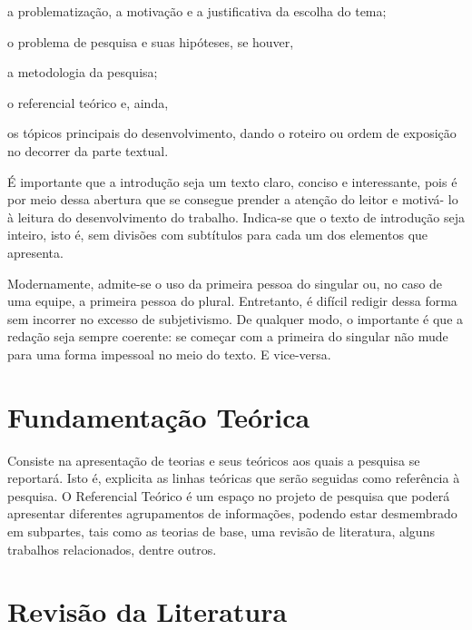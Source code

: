\documentclass[12pt,oneside,a4paper,chapter=TITLE,section=TITLE,sumario=tradicional]{abntex2}
\begin{document}
\begin{lista}
    \item a problematização, a motivação e a justificativa da escolha do tema;
    \item o problema de pesquisa e suas hipóteses, se houver,
    \item a metodologia da pesquisa;
    \item o referencial teórico e, ainda,
    \item os tópicos principais do desenvolvimento, dando o roteiro ou
    ordem de exposição no decorrer da parte textual.
\end{lista}

É importante que a introdução seja um texto claro, conciso e interessante, pois 
é por meio dessa abertura que se consegue prender a atenção do leitor e motivá- 
lo à leitura do desenvolvimento do trabalho. Indica-se que o texto de 
introdução seja inteiro, isto é, sem divisões com subtítulos para cada um dos 
elementos que apresenta.

Modernamente, admite-se o uso da primeira pessoa do singular ou, no caso de uma 
equipe, a primeira pessoa do plural. Entretanto, é difícil redigir dessa forma 
sem incorrer no excesso de subjetivismo. De qualquer modo, o importante é que a 
redação seja sempre coerente: se começar com a primeira do singular não mude 
para uma forma impessoal no meio do texto. E vice-versa.

\chapter{Fundamentação Teórica}
\label{cap:fundamentacao-teorica}

Consiste na apresentação de teorias e seus teóricos aos quais a pesquisa se 
reportará. Isto é, explicita as linhas teóricas que serão seguidas como 
referência à pesquisa. O Referencial Teórico é um espaço no projeto de pesquisa 
que poderá apresentar diferentes agrupamentos de informações, podendo estar 
desmembrado em subpartes, tais como as teorias de base, uma revisão de 
literatura, alguns trabalhos relacionados, dentre outros.

\chapter{Revisão da Literatura}
\label{cap:revisao-literatura}
\end{document}
